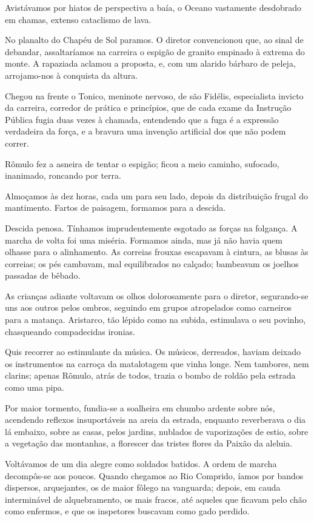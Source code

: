 Avistávamos por hiatos de perspectiva a baía, o Oceano 
vastamente desdobrado em chamas, extenso cataclismo de lava. 

No planalto do Chapéu de Sol paramos. O diretor convencionou que,
ao sinal de debandar, assaltaríamos na carreira o espigão de granito
empinado à extrema do monte. A rapaziada aclamou a proposta, e, com um
alarido bárbaro de peleja, arrojamo{}-nos à conquista da altura. 

Chegou na frente o Tonico, meninote nervoso, de são Fidélis, especialista
invicto da carreira, corredor de prática e princípios, que de cada
exame da Instrução Pública fugia duas vezes à chamada, entendendo que a
fuga é a expressão verdadeira da força, e a bravura uma invenção
artificial dos que não podem correr. 

Rômulo fez a asneira de tentar o
espigão; ficou a meio caminho, sufocado, inanimado, roncando por terra.

Almoçamos às dez horas, cada um para seu lado, depois da distribuição
frugal do mantimento. Fartos de paisagem, formamos para a descida.

Descida penosa. Tínhamos imprudentemente esgotado as forças na
folgança. A marcha de volta foi uma miséria. Formamos ainda, mas já não
havia quem olhasse para o alinhamento. As correias frouxas escapavam à
cintura, as blusas às correias; os pés cambavam, mal equilibrados no
calçado; bambeavam os joelhos passadas de bêbado. 

As crianças adiante voltavam os olhos dolorosamente para o diretor, 
segurando{}-se uns aos
outros pelos ombros, seguindo em grupos atropelados como carneiros para
a matança. Aristarco, tão lépido como na subida, estimulava o seu
povinho, chasqueando compadecidas ironias. 

Quis recorrer ao estimulante
da música. Os músicos, derreados, haviam deixado os instrumentos na
carroça da matalotagem que vinha longe. Nem tambores, nem clarins;
apenas Rômulo, atrás de todos, trazia o bombo de roldão pela estrada
como uma pipa. 

Por maior tormento, fundia{}-se a soalheira em chumbo
ardente sobre nós, acendendo reflexos insuportáveis na areia da
estrada, enquanto reverberava o dia lá embaixo, sobre as casas, pelos
jardins, nublados de vaporizações de estio, sobre a vegetação das
montanhas, a florescer das tristes flores da Paixão da aleluia.

Voltávamos de um dia alegre como soldados batidos. A ordem de marcha
decompôs{}-se aos poucos. Quando chegamos ao Rio Comprido, íamos por
bandos dispersos, arquejantes, os de maior fôlego na
vanguarda; depois, em cauda interminável de alquebramento, os mais
fracos, até aqueles que ficavam pelo chão como enfermos, e que os
inspetores buscavam como gado perdido. 

